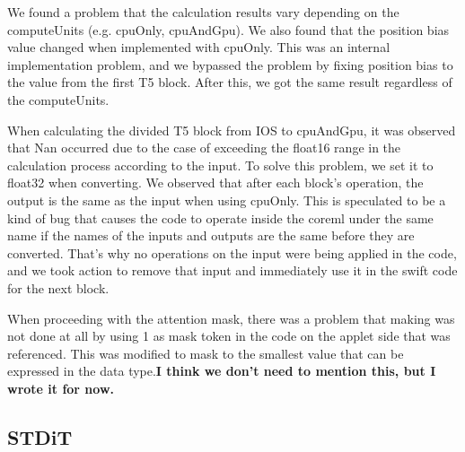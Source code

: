 We found a problem that the calculation results vary depending on the computeUnits (e.g. cpuOnly, cpuAndGpu). We also found that the position bias value changed when implemented with cpuOnly. This was an internal implementation problem, and we bypassed the problem by fixing position bias to the value from the first T5 block. After this, we got the same result regardless of the computeUnits.

When calculating the divided T5 block from IOS to cpuAndGpu, it was observed that Nan occurred due to the case of exceeding the float16 range in the calculation process according to the input. To solve this problem, we set it to float32 when converting. We observed that after each block's operation, the output is the same as the input when using cpuOnly. This is speculated to be a kind of bug that causes the code to operate inside the coreml under the same name if the names of the inputs and outputs are the same before they are converted. That's why no operations on the input were being applied in the code, and we took action to remove that input and immediately use it in the swift code for the next block.

When proceeding with the attention mask, there was a problem that making was not done at all by using 1 as mask token in the code on the applet side that was referenced. This was modified to mask to the smallest value that can be expressed in the data type.\textbf{I think we don't need to mention this, but I wrote it for now.}

\subsection{STDiT}


\bonote{}

